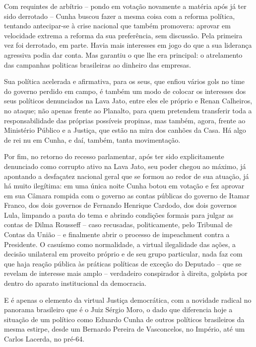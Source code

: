 Com requintes de arbítrio -- pondo em votação novamente a matéria após
já ter sido derrotado -- Cunha buscou fazer a mesma coisa com a reforma
política, tentando antecipar-se à crise nacional que também promovera:
aprovar em velocidade extrema a reforma da sua preferência, sem
discussão. Pela primeira vez foi derrotado, em parte. Havia mais
interesses em jogo do que a sua liderança agressiva podia dar conta. Mas
garantiu o que lhe era principal: o atrelamento das campanhas politicas
brasileiras ao dinheiro das empresas.

Sua política acelerada e afirmativa, para os seus, que enfiou vários
gols no time do governo perdido em campo, é também um modo de colocar os
interesses dos seus políticos denunciados na Lava Jato, entre eles ele
próprio e Renan Calheiros, no ataque; não apenas frente ao Planalto,
para quem pretendem transferir toda a responsabilidade das próprias
possíveis propinas, mas também, agora, frente ao Ministério Público e a
Justiça, que estão na mira dos canhões da Casa. Há algo de rei nu em
Cunha, e daí, também, tanta movimentação.

Por fim, no retorno do recesso parlamentar, após ter sido explicitamente
denunciado como corrupto ativo na Lava Jato, seu poder chegou ao máximo,
já apontando a desfaçatez nacional geral que se formou ao redor de sua
atuação, já há muito ilegítima: em uma única noite Cunha botou em
votação e fez aprovar em sua Câmara rompida com o governo as contas
públicas do governo de Itamar Franco, dos dois governos de Fernando
Henrique Cardodo, dos dois governos Lula, limpando a pauta do tema e
abrindo condições formais para julgar as contas de Dilma Rousseff --
caso recusadas, politicamente, pelo Tribunal de Contas da União -- e
finalmente abrir o processo de impeachment contra a Presidente. O
casuísmo como normalidade, a virtual ilegalidade das ações, a decisão
unilateral em proveito próprio e de seu grupo particular, nada faz com
que haja reação pública às práticas políticas de exceção do Deputado --
que se revelam de interesse mais amplo -- verdadeiro conspirador à
direita, golpista por dentro do aparato institucional da democracia.

E é apenas o elemento da virtual Justiça democrática, com a novidade
radical no panorama brasileiro que é o Juiz Sérgio Moro, o dado que
diferencia hoje a situação de um político como Eduardo Cunha de outros
políticos brasileiros da mesma estirpe, desde um Bernardo Pereira de
Vasconcelos, no Império, até um Carlos Lacerda, no pré-64.

